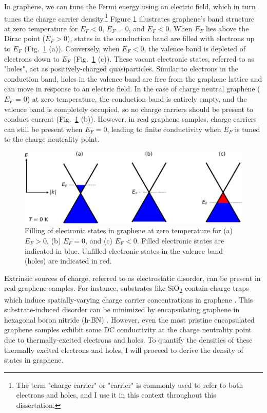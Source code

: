 \documentclass[double,12pt,1in,seploa]{beavtex}
\begin{document}
In graphene, we can tune the Fermi energy using an electric field, which in turn tunes the charge carrier density.\footnote{The term "charge carrier" or "carrier" is commonly used to refer to both electrons and holes, and I use it in this context throughout this dissertation.} Figure \ref{graphene bands at 0 T} illustrates graphene's band structure at zero temperature for $E_F < 0$, $E_F = 0$, and $E_F < 0$. When $E_F$ lies above the Dirac point ($E_F > 0$), states in the conduction band are filled with electrons up to $E_F$ (Fig.\ \ref{graphene bands at 0 T} (a)). Conversely, when $E_F < 0$, the valence band is depleted of electrons down to $E_F$ (Fig.\ \ref{graphene bands at 0 T} (c)). These vacant electronic states, referred to as "holes", act as positively-charged quasiparticles. Similar to electrons in the conduction band, holes in the valence band are free from the graphene lattice and can move in response to an electric field. In the case of charge neutral graphene ($E_F$ = 0) at zero temperature, the conduction band is entirely empty, and the valence band is completely occupied, so no charge carriers should be present to conduct current (Fig.\ \ref{graphene bands at 0 T} (b)). However, in real graphene samples, charge carriers can still be present when $E_F = 0$, leading to finite conductivity when $E_F$ is tuned to the charge neutrality point.
\begin{figure}
    \includegraphics{graphene theory 0}
    \caption{Filling of electronic states in graphene at zero temperature for (a) $E_F >0$, (b) $E_F = 0$, and (c) $E_F < 0$. Filled electronic states are indicated in blue. Unfilled electronic states in the valence band (holes) are indicated in red.}
    \label{graphene bands at 0 T}
\end{figure}

Extrinsic sources of charge, referred to as electrostatic disorder, can be present in real graphene samples. For instance, substrates like SiO\textsubscript{2} contain charge traps which induce spatially-varying charge carrier concentrations in graphene \cite{martin_observation_2008}. This substrate-induced disorder can be minimized by encapsulating graphene in hexagonal boron nitride (h-BN) \cite{dean_boron_2010}. However, even the most pristine encapsulated graphene samples exhibit some DC conductivity at the charge neutrality point \cite{xin_giant_2023} due to thermally-excited electrons and holes. To quantify the densities of these thermally excited electrons and holes, I will proceed to derive the density of states in graphene.
\end{document}
